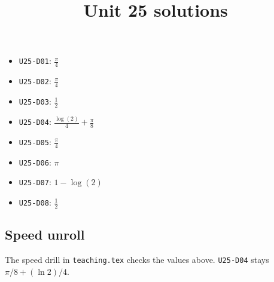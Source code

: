 \title{Unit 25 solutions}\maketitle\begin{itemize}
  \item \texttt{U25-D01}: $\frac{\pi}{4}$
  \item \texttt{U25-D02}: $\frac{\pi}{4}$
  \item \texttt{U25-D03}: $\frac{1}{2}$
  \item \texttt{U25-D04}: $\frac{\log{\left(2 \right)}}{4} + \frac{\pi}{8}$
  \item \texttt{U25-D05}: $\frac{\pi}{4}$
  \item \texttt{U25-D06}: $\pi$
  \item \texttt{U25-D07}: $1 - \log{\left(2 \right)}$
  \item \texttt{U25-D08}: $\frac{1}{2}$
\end{itemize}
\subsection*{Speed unroll}
The speed drill in \texttt{teaching.tex} checks the values above. \texttt{U25-D04} stays $\pi/8+(\ln 2)/4$.

